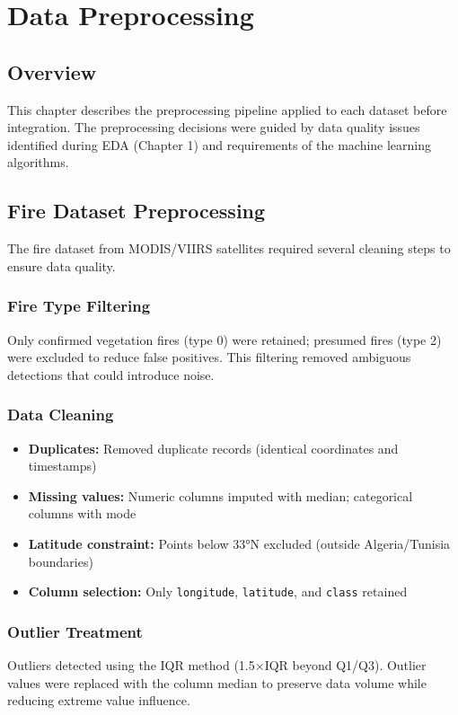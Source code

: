 \chapter{Data Preprocessing}

\section{Overview}
This chapter describes the preprocessing pipeline applied to each dataset before integration. The preprocessing decisions were guided by data quality issues identified during EDA (Chapter 1) and requirements of the machine learning algorithms.

\section{Fire Dataset Preprocessing}

The fire dataset from MODIS/VIIRS satellites required several cleaning steps to ensure data quality.

\subsection{Fire Type Filtering}
Only confirmed vegetation fires (type 0) were retained; presumed fires (type 2) were excluded to reduce false positives. This filtering removed ambiguous detections that could introduce noise.

\subsection{Data Cleaning}
\begin{itemize}
    \item \textbf{Duplicates:} Removed duplicate records (identical coordinates and timestamps)
    \item \textbf{Missing values:} Numeric columns imputed with median; categorical columns with mode
    \item \textbf{Latitude constraint:} Points below 33°N excluded (outside Algeria/Tunisia boundaries)
    \item \textbf{Column selection:} Only \texttt{longitude}, \texttt{latitude}, and \texttt{class} retained
\end{itemize}

\subsection{Outlier Treatment}
Outliers detected using the IQR method (1.5$\times$IQR beyond Q1/Q3). Outlier values were replaced with the column median to preserve data volume while reducing extreme value influence.

